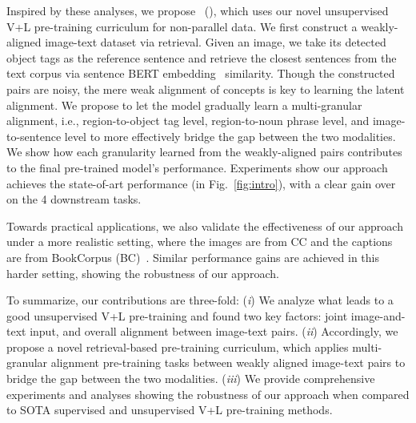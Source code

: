 Inspired by these analyses, we propose \ModelFullName~(\ModelName), which uses our novel unsupervised V+L pre-training curriculum for non-parallel data.
We first construct a weakly-aligned image-text dataset via retrieval.
Given an image, we take its detected object tags as the reference sentence and retrieve the closest sentences from the text corpus via sentence BERT embedding~\cite{reimers-gurevych-2019-sentence} similarity.
Though the constructed pairs are noisy, the mere weak alignment of concepts is key to learning the latent alignment.
We propose to let the model gradually learn a multi-granular alignment, i.e., region-to-object tag level, region-to-noun phrase level, and image-to-sentence level to more effectively bridge the gap between the two modalities.
We show how each granularity learned from the weakly-aligned pairs contributes to the final pre-trained model's performance.
Experiments show our approach achieves the state-of-art performance
(in Fig.~\ref{fig:intro}), with a clear gain over~\cite{li2020unsupervised} on the 4 downstream tasks.

Towards practical applications, we also validate the effectiveness of our approach under a more realistic setting, where the images are from CC and the captions are from BookCorpus (BC)~\cite{Zhu_2015_ICCV}.
Similar performance gains are achieved in this harder setting, showing the robustness of our approach.

To summarize, our contributions are three-fold: 
(\textit{i}) We analyze what leads to a good unsupervised V+L pre-training and found two key factors: joint image-and-text input, and overall alignment between image-text pairs.
(\textit{ii}) Accordingly, we propose a novel retrieval-based pre-training curriculum, which applies multi-granular alignment pre-training tasks between weakly aligned image-text pairs to bridge the gap between the two modalities.
(\textit{iii}) We provide comprehensive experiments and analyses showing the robustness of our approach when compared to SOTA supervised and unsupervised V+L pre-training methods.






